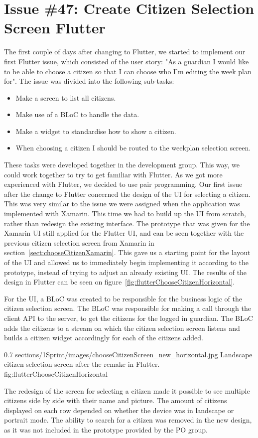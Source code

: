 \section{Issue \#47: Create Citizen Selection Screen Flutter} 
\label{sect:chooseCitizenFlutter}
The first couple of days after changing to Flutter, we started to implement our first Flutter issue, which consisted of the user story: "As a guardian I would like to be able to choose a citizen so that I can choose who I’m editing the week plan for". The issue was divided into the following sub-tasks:

\begin{itemize}
    \item Make a screen to list all citizens.
    \item Make use of a BLoC to handle the data.
    \item Make a widget to standardise how to show a citizen.
    \item When choosing a citizen I should be routed to the weekplan selection screen.
\end{itemize}

These tasks were developed together in the development group. This way, we could work together to try to get familiar with Flutter. As we got more experienced with Flutter, we decided to use pair programming.
Our first issue after the change to Flutter concerned the design of the UI for selecting a citizen. This was very similar to the issue we were assigned when the application was implemented with Xamarin. This time we had to build up the UI from scratch, rather than redesign the existing interface. 
The prototype that was given for the Xamarin UI still applied for the Flutter UI, and can be seen together with the previous citizen selection screen from Xamarin in section~\ref{sect:chooseCitizenXamarin}. This gave us a starting point for the layout of the UI and allowed us to immediately begin implementing it according to the prototype, instead of trying to adjust an already existing UI.
The results of the design in Flutter can be seen on figure~\ref{fig:flutterChooseCitizenHorizontal}.

For the UI, a BLoC was created to be responsible for the business logic of the citizen selection screen. The BLoC was responsible for making a call through the client API to the server, to get the citizens for the logged in guardian. The BLoC adds the citizens to a stream on which the citizen selection screen listens and builds a citizen widget accordingly for each of the citizens added.

        {0.7} %
        {sections/1Sprint/images/chooseCitizenScreen_new_horizontal.jpg} %
        {Landscape citizen selection screen after the remake in Flutter.} %
        {fig:flutterChooseCitizenHorizontal} %

The redesign of the screen for selecting a citizen made it possible to see multiple citizens side by side with their name and picture. The amount of citizens displayed on each row depended on whether the device was in landscape or portrait mode. 
The ability to search for a citizen was removed in the new design, as it was not included in the prototype provided by the PO group.